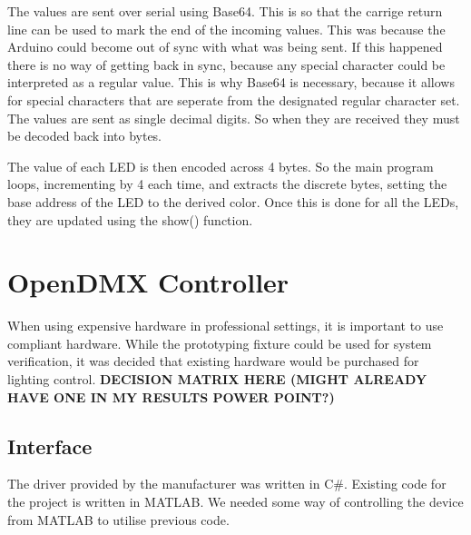 The values are sent over serial using Base64.
This is so that the carrige return line can be used to mark the end of the incoming values.
This was because the Arduino could become out of sync with what was being sent.
If this happened there is no way of getting back in sync,
because any special character could be interpreted as a regular value.
This is why Base64 is necessary, because it allows for special characters that are seperate
from the designated regular character set.
The values are sent as single decimal digits.
So when they are received they must be decoded back into bytes.

The value of each LED is then encoded across 4 bytes.
So the main program loops, incrementing by 4 each time,
and extracts the discrete bytes, setting the base address of the LED to the derived color.
Once this is done for all the LEDs, they are updated using the show() function.

\section{OpenDMX Controller}
When using expensive hardware in professional settings, it is important to use compliant hardware.
While the prototyping fixture could be used for system verification,
it was decided that existing hardware would be purchased for lighting control.
\textbf{DECISION MATRIX HERE (MIGHT ALREADY HAVE ONE IN MY RESULTS POWER POINT?)}

\subsection{Interface}
The driver provided by the manufacturer was written in C\#.
Existing code for the project is written in MATLAB.
We needed some way of controlling the device from MATLAB to utilise previous code.
